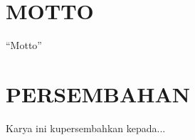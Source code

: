 \chapter*{MOTTO}

``Motto''\\

\newpage

\chapter*{PERSEMBAHAN}

Karya ini kupersembahkan kepada...\\

\newpage
